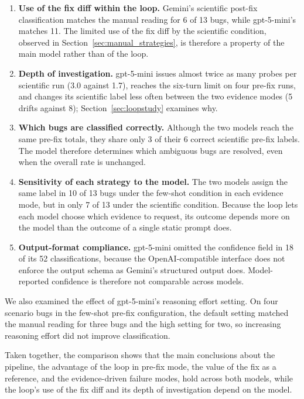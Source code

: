 \documentclass{iutbscthesis}
\begin{document}
\begin{enumerate}
    \item \textbf{Use of the fix diff within the loop.} Gemini's scientific post-fix classification matches the manual reading for 6 of 13 bugs, while gpt-5-mini's matches 11. The limited use of the fix diff by the scientific condition, observed in Section~\ref{sec:manual_strategies}, is therefore a property of the main model rather than of the loop.
    \item \textbf{Depth of investigation.} gpt-5-mini issues almost twice as many probes per scientific run (3.0 against 1.7), reaches the six-turn limit on four pre-fix runs, and changes its scientific label less often between the two evidence modes (5 drifts against 8); Section~\ref{sec:loopstudy} examines why.
    \item \textbf{Which bugs are classified correctly.} Although the two models reach the same pre-fix totals, they share only 3 of their 6 correct scientific pre-fix labels. The model therefore determines which ambiguous bugs are resolved, even when the overall rate is unchanged.
    \item \textbf{Sensitivity of each strategy to the model.} The two models assign the same label in 10 of 13 bugs under the few-shot condition in each evidence mode, but in only 7 of 13 under the scientific condition. Because the loop lets each model choose which evidence to request, its outcome depends more on the model than the outcome of a single static prompt does.
    \item \textbf{Output-format compliance.} gpt-5-mini omitted the confidence field in 18 of its 52 classifications, because the OpenAI-compatible interface does not enforce the output schema as Gemini's structured output does. Model-reported confidence is therefore not comparable across models.
\end{enumerate}

We also examined the effect of gpt-5-mini's reasoning effort setting. On four scenario bugs in the few-shot pre-fix configuration, the default setting matched the manual reading for three bugs and the high setting for two, so increasing reasoning effort did not improve classification.

Taken together, the comparison shows that the main conclusions about the pipeline, the advantage of the loop in pre-fix mode, the value of the fix as a reference, and the evidence-driven failure modes, hold across both models, while the loop's use of the fix diff and its depth of investigation depend on the model.
\end{document}
